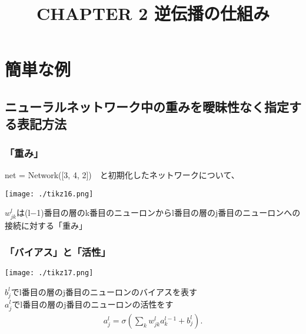 \documentclass[11pt,a4paper,fleqn]{jsarticle}
\begin{document}
\title{CHAPTER 2 逆伝播の仕組み}
\maketitle
\section{簡単な例}
\subsection{ニューラルネットワーク中の重みを曖昧性なく指定する表記方法}
\subsubsection{「重み」}
net = Network([3, 4, 2])　と初期化したネットワークについて、

    \begin{center}
        \texttt{[image: ./tikz16.png]} \\
    \end{center}
$w^l_{jk}$は(l−1)番目の層のk番目のニューロンからl番目の層のj番目のニューロンへの接続に対する「重み」\\
\subsubsection{「バイアス」と「活性」}
    \begin{center}
        \texttt{[image: ./tikz17.png]} \\
    \end{center}
$b^l_j$でl番目の層のj番目のニューロンのバイアスを表す\\
$a^l_j$でl番目の層のj番目のニューロンの活性をす\\
\begin{eqnarray}
  a^{l}_j = \sigma\left( \sum_k w^{l}_{jk} a^{l-1}_k + b^l_j \right).
\end{eqnarray}
\newpage
\end{document}
